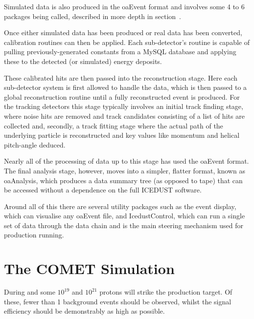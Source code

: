 Simulated data is also produced in the oaEvent format and involves some 4 to 6 packages being called, described in more depth in section~.

Once either simulated data has been produced or real data has been converted, calibration routines can then be applied.
Each sub-detector's routine is capable of pulling previously-generated constants from a MySQL database and applying these to the detected (or simulated) energy deposits.

These calibrated hits are then passed into the reconstruction stage.  
Here each sub-detector system is first allowed to handle the data, which is then passed to a global reconstruction routine until a fully reconstructed event is produced.
For the tracking detectors this stage typically involves an initial track finding stage, where noise hits are removed and track candidates consisting of a list of hits are collected and, secondly, a track fitting stage where the actual path of the underlying particle is reconstructed and key values like momentum and helical pitch-angle deduced.

Nearly all of the processing of data up to this stage has used the oaEvent format.
The final analysis stage, however, moves into a simpler, flatter format, known as oaAnalysis, which produces a data summary tree (as opposed to tape) that can be accessed without a dependence on the full ICEDUST software.

Around all of this there are several utility packages such as the event display, which can visualise any oaEvent file, and IcedustControl, which can run a single set of data through the data chain and is the main steering mechanism used for production running.

\section{The COMET Simulation}
During \phaseI and \phaseI some $10^{19}$ and $10^{21}$ protons will strike the production target.
Of these, fewer than 1 background events should be observed, whilst the signal efficiency should be demonstrably as high as possible.
%

